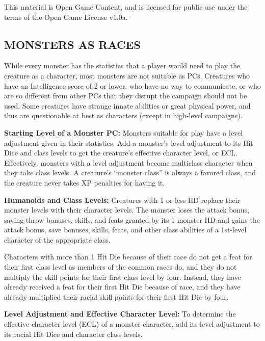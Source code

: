\documentclass{article}
\begin{document}
This material is Open Game Content, and is licensed for public use under the terms 
of the Open Game License v1.0a.

\subsection*{{\LARGE{}MONSTERS AS RACES}}

\vspace{12pt}
While every monster\textit{ }has the statistics that a player would need to play 
the creature as a character, most monsters are not suitable as PCs. Creatures who 
have an Intelligence score of 2 or lower, who have no way to communicate, or who 
are so different from other PCs that they disrupt the campaign should not be used. 
 Some creatures have strange innate abilities or great physical power, and thus 
are questionable at best as characters (except in high-level campaigns). 

\vspace{12pt}
\textbf{Starting Level of a Monster PC:} Monsters suitable for play have a level 
adjustment given in their statistics. Add a monster's level adjustment to its Hit 
Dice and class levels to get the creature's effective character level, or ECL. 
Effectively, monsters with a level adjustment become multiclass character when 
they take class levels\textit{.} A creature's ``monster class'' is always a favored 
class, and the creature never takes XP penalties for having it.

\vspace{12pt}
\textbf{Humanoids and Class Levels:} Creatures with 1 or less HD replace their 
monster levels with their character levels. The monster loses the attack bonus, 
saving throw bonuses, skills, and feats granted by its 1 monster HD and gains the 
attack bonus, save bonuses, skills, feats, and other class abilities of a 1st-level 
character of the appropriate class.

Characters with more than 1 Hit Die because of their race do not get a feat for 
their first class level as members of the common races do, and they do not multiply 
the skill points for their first class level by four. Instead, they have already 
received a feat for their first Hit Die because of race, and they have already 
multiplied their racial skill points for their first Hit Die by four.

\vspace{12pt}
\textbf{Level Adjustment and Effective Character Level:} To determine the effective 
character level (ECL) of a monster character, add its level adjustment to its racial 
Hit Dice and character class levels. 
\end{document}
